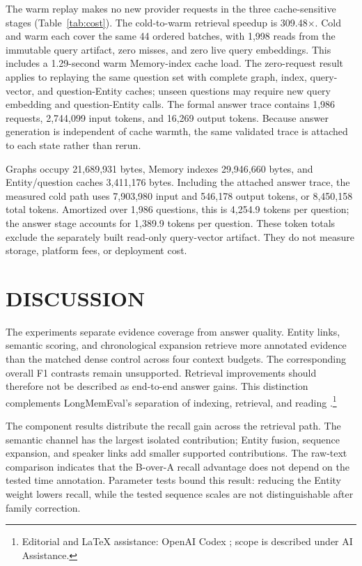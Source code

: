 \documentclass[a4paper,twoside]{article}
\newcommand{\aiedit}{\footnote{Editorial and \LaTeX{} assistance: OpenAI Codex
\cite{openai2026codex}; scope is described under AI Assistance.}}
\begin{document}
The warm replay makes no new provider requests in the three cache-sensitive
stages (Table~\ref{tab:cost}). The cold-to-warm retrieval speedup is 309.48$\times$.
Cold and warm each cover the same 44 ordered batches, with 1,998 reads from the
immutable query artifact, zero misses, and zero live query embeddings. This
includes a 1.29-second warm Memory-index cache load. The zero-request result
applies to replaying the same question set with complete
graph, index, query-vector, and question-Entity caches; unseen questions may
require new query embedding and question-Entity calls. The formal answer trace
contains 1,986 requests, 2,744,099 input tokens, and 16,269 output tokens.
Because answer generation is independent of cache warmth, the same validated
trace is attached to each state rather than rerun.

Graphs occupy 21,689,931 bytes, Memory indexes 29,946,660 bytes, and
Entity/question caches 3,411,176 bytes. Including the attached answer trace,
the measured cold path uses 7,903,980 input and 546,178 output tokens, or
8,450,158 total tokens. Amortized over 1,986 questions, this is 4,254.9 tokens
per question; the answer stage accounts for 1,389.9 tokens per question.
These token totals exclude the separately built read-only query-vector
artifact. They do not measure storage, platform fees, or deployment cost.

\section{\uppercase{Discussion}}

The experiments separate evidence coverage from answer quality. Entity
links, semantic scoring, and chronological expansion retrieve more annotated
evidence than the matched dense control across four context budgets.
The corresponding overall F1 contrasts remain unsupported. Retrieval
improvements should therefore not be described as end-to-end answer gains.
This distinction complements LongMemEval's separation of indexing, retrieval,
and reading \cite{wu2025longmemeval}.\aiedit{}

The component results distribute the recall gain across the retrieval path.
The semantic channel has the largest isolated contribution; Entity fusion,
sequence expansion, and speaker links add smaller supported contributions.
The raw-text comparison indicates that the B-over-A recall advantage does not
depend on the tested time annotation. Parameter tests bound this result:
reducing the Entity weight lowers recall, while the tested sequence scales
are not distinguishable after family correction.
\end{document}
